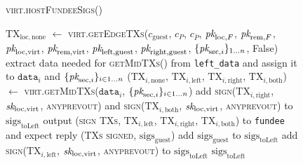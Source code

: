 \begin{figure}[H]
  \begin{processbox}{\textsc{virt.hostFundeeSigs}()}
    \begin{algorithmic}[1]
      \State $\mathrm{TX}_{\mathrm{loc}, \mathrm{none}}$ $\gets$
      \textsc{virt.getEdgeTXs}($c_{\mathrm{guest}}$, $c_P$, $c_{\bar{P}}$,
      $\textit{pk}_{\mathrm{loc}, F}$, $\textit{pk}_{\mathrm{rem}, F}$, $\textit{pk}_{\mathrm{loc},
      \mathrm{virt}}$, $\textit{pk}_{\mathrm{rem}, \mathrm{virt}}$,
      $\textit{pk}_{\mathrm{left}, \mathrm{guest}}$, $\textit{pk}_{\mathrm{right},
      \mathrm{guest}}$, $\{\textit{pk}_{\mathrm{sec}, i}\}_{1 \dots n}$, False)
      \label{code:virtual-layer:fundee-sigs:tx-none}
        \State extract data needed for \textsc{getMidTXs}() from
        \texttt{left\_data} and assign it to $\texttt{data}_i$ and
        $\{\textit{pk}_{\mathrm{sec}, i}\}_{i \in 1 \dots n}$
        \State ($\mathrm{TX}_{i, \mathrm{none}}$, $\mathrm{TX}_{i,
        \mathrm{left}}$, $\mathrm{TX}_{i, \mathrm{right}}$, $\mathrm{TX}_{i,
        \mathrm{both}}$) $\gets$ \textsc{virt.getMidTXs}($\texttt{data}_i$,
        $\{\textit{pk}_{\mathrm{sec}, i}\}_{i \in 1 \dots n}$)
        \State add \textsc{sign}($\mathrm{TX}_{i, \mathrm{right}}$,
        $\textit{sk}_{\mathrm{loc}, \mathrm{virt}}$, \textsc{anyprevout}) and
        \textsc{sign}($\mathrm{TX}_{i, \mathrm{both}}$, $\textit{sk}_{\mathrm{loc},
        \mathrm{virt}}$, \textsc{anyprevout}) to
        $\mathrm{sigs}_{\mathrm{toLeft}}$ 
        \State output (\textsc{sign TXs}, $\mathrm{TX}_{i, \mathrm{left}}$,
        $\mathrm{TX}_{i, \mathrm{right}}$, $\mathrm{TX}_{i, \mathrm{both}}$)
        to \texttt{fundee} and expect reply (\textsc{TXs signed},
        $\mathrm{sigs}_{\mathrm{guest}}$)
        \State add $\mathrm{sigs}_{\mathrm{guest}}$ to
        $\mathrm{sigs}_{\mathrm{toLeft}}$
         
          \State add \textsc{sign}($\mathrm{TX}_{i, \mathrm{left}}$,
          $\textit{sk}_{\mathrm{loc}, \mathrm{virt}}$, \textsc{anyprevout}) to
          $\mathrm{sigs}_{\mathrm{toLeft}}$
        \EndIf
      \EndFor
      \State \Return $\mathrm{sigs}_{\mathrm{toLeft}}$
    \end{algorithmic}
  \end{processbox}
  \caption{}
  \label{code:virtual-layer:fundee-sigs}
\end{figure}

